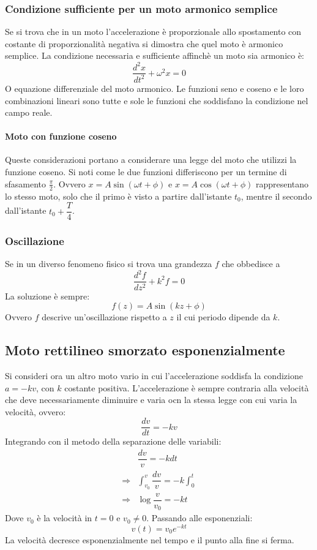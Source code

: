 		\subsubsection{Condizione sufficiente per un moto armonico semplice}
		Se si trova che in un moto l'accelerazione \`e proporzionale allo spostamento con costante di proporzionalit\`a negativa si dimostra che quel moto \`e armonico semplice.
		La condizione necessaria e sufficiente affinch\`e un moto sia armonico \`e:
		$$\dfrac{d^2x}{dt^2}+\omega^2x=0$$
		O equazione differenziale del moto armonico.
		Le funzioni seno e coseno e le loro combinazioni lineari sono tutte e sole le funzioni che soddisfano la condizione nel campo reale.

			\paragraph{Moto con funzione coseno}
			Queste considerazioni portano a considerare una legge del moto che utilizzi la funzione coseno.
			Si noti come le due funzioni differiscono per un termine di sfasamento $\frac{\pi}{2}$.
			Ovvero $x=A\sin(\omega t+\phi)$ e $x = A\cos(\omega t+\phi)$ rappresentano lo stesso moto, solo che il primo \`e visto a partire dall'istante $t_0$, mentre il secondo dall'istante $t_0 + \dfrac{T}{4}$.

		\subsubsection{Oscillazione}
		Se in un diverso fenomeno fisico si trova una grandezza $f$ che obbedisce a
		$$\dfrac{d^2f}{dz^2}+k^2f=0$$
		La soluzione \`e sempre:
		$$f(z)=A\sin(kz+\phi)$$
		Ovvero $f$ descrive un'oscillazione rispetto a $z$ il cui periodo dipende da $k$.

	\subsection{Moto rettilineo smorzato esponenzialmente}
	Si consideri ora un altro moto vario in cui l'accelerazione soddisfa la condizione $a = -kv$, con $k$ costante positiva.
	L'accelerazione \`e sempre contraria alla velocit\`a che deve necessariamente diminuire e varia ocn la stessa legge con cui varia la velocit\`a, ovvero:
	$$\dfrac{dv}{dt} = -kv$$
	Integrando con il metodo della separazione delle variabili:
	\begin{align*}
		&\dfrac{dv}{v} = -kdt\\
		\Rightarrow&\int_{v_0}^v\dfrac{dv}{v} = -k\int_0^t\\
		\Rightarrow &\log\dfrac{v}{v_0} = -kt
	\end{align*}
	Dove $v_0$ \`e la velocit\`a in $t=0$ e $v_0\neq 0$.
	Passando alle esponenziali:
	$$v(t) = v_0e^{-kt}$$
	La velocit\`a decresce esponenzialmente nel tempo e il punto alla fine si ferma.

